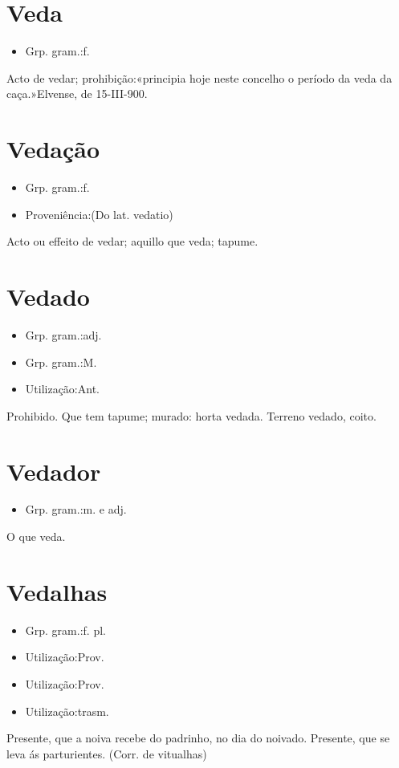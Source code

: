 \documentclass{article}
\begin{document}
\section{Veda}
\begin{itemize}
\item {Grp. gram.:f.}
\end{itemize}
Acto de vedar; prohibição:«\textunderscore principia hoje neste concelho o período da veda da caça.\textunderscore »\textunderscore Elvense\textunderscore , de 15-III-900.
\section{Vedação}
\begin{itemize}
\item {Grp. gram.:f.}
\end{itemize}
\begin{itemize}
\item {Proveniência:(Do lat. \textunderscore vedatio\textunderscore )}
\end{itemize}
Acto ou effeito de vedar; aquillo que veda; tapume.
\section{Vedado}
\begin{itemize}
\item {Grp. gram.:adj.}
\end{itemize}
\begin{itemize}
\item {Grp. gram.:M.}
\end{itemize}
\begin{itemize}
\item {Utilização:Ant.}
\end{itemize}
Prohibido.
Que tem tapume; murado: \textunderscore horta vedada\textunderscore .
Terreno vedado, coito.
\section{Vedador}
\begin{itemize}
\item {Grp. gram.:m.  e  adj.}
\end{itemize}
O que veda.
\section{Vedalhas}
\begin{itemize}
\item {Grp. gram.:f. pl.}
\end{itemize}
\begin{itemize}
\item {Utilização:Prov.}
\end{itemize}
\begin{itemize}
\item {Utilização:Prov.}
\end{itemize}
\begin{itemize}
\item {Utilização:trasm.}
\end{itemize}
Presente, que a noiva recebe do padrinho, no dia do noivado.
Presente, que se leva ás parturientes.
(Corr. de \textunderscore vitualhas\textunderscore )
\end{document}
